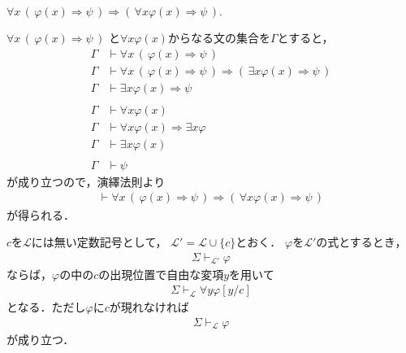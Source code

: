 	\begin{screen}
		$\forall x\,  \left(\, \varphi(x) \Longrightarrow \psi\, \right)
		\Longrightarrow \left(\, \forall x \varphi(x) \Longrightarrow \psi\, \right).$
	\end{screen}
	
	$\forall x\,  \left(\, \varphi(x) \Longrightarrow \psi\, \right)$
	と$\forall x \varphi(x)$からなる文の集合を$\Gamma$とすると，
	\begin{align}
		\Gamma &\vdash \forall x\,  \left(\, \varphi(x) \Longrightarrow \psi\, \right) \\
		\Gamma &\vdash \forall x\,  \left(\, \varphi(x) \Longrightarrow \psi\, \right) \Longrightarrow \left(\, \exists x \varphi(x) \Longrightarrow \psi\, \right) \\
		\Gamma &\vdash \exists x \varphi(x) \Longrightarrow \psi \\
		& \\
		\Gamma &\vdash \forall x \varphi(x) \\
		\Gamma &\vdash \forall x \varphi(x) \Longrightarrow \exists x \varphi \\
		\Gamma &\vdash \exists x \varphi(x) \\
		& \\
		\Gamma &\vdash \psi
	\end{align}
	が成り立つので，演繹法則より
	\begin{align}
		\vdash \forall x\,  \left(\, \varphi(x) \Longrightarrow \psi\, \right)
		\Longrightarrow \left(\, \forall x \varphi(x) \Longrightarrow \psi\, \right)
	\end{align}
	が得られる．
	
	\begin{screen}
		$c$を$\mathcal{L}$には無い定数記号として，
		$\mathcal{L}' = \mathcal{L} \cup \{c\}$とおく．
		$\varphi$を$\mathcal{L}'$の式とするとき，
		\begin{align}
			\Sigma \vdash_{\mathcal{L}'} \varphi
		\end{align}
		ならば，$\varphi$の中の$c$の出現位置で自由な変項$y$を用いて
		\begin{align}
			\Sigma \vdash_{\mathcal{L}} \forall y \varphi[y/c]
		\end{align}
		となる．ただし$\varphi$に$c$が現れなければ
		\begin{align}
			\Sigma \vdash_{\mathcal{L}} \varphi
		\end{align}
		が成り立つ．
	\end{screen}
	
